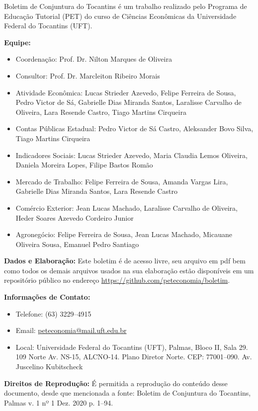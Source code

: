 \begin{tcolorbox}[colback=boxbackground, colframe=boxbackground, arc=0mm, top=15pt]
Boletim de Conjuntura do Tocantins é um trabalho realizado pelo Programa de Educação Tutorial (PET) do curso de Ciências Econômicas da Universidade Federal do Tocantins (UFT).
\\
\par{\bf Equipe:}
\begin{itemize}
	\item{Coordenação:} Prof. Dr. Nilton Marques de Oliveira
	\item{Consultor:} Prof. Dr. Marcleiton Ribeiro Morais
	\item{Atividade Econômica:} Lucas Strieder Azevedo, Felipe Ferreira de Sousa, Pedro Victor de Sá, Gabrielle Dias Miranda Santos, Laralisse Carvalho de Oliveira, Lara Resende Castro, Tiago Martins Cirqueira
	\item{Contas Públicas Estadual:} Pedro Victor de Sá Castro, Aleksander Bovo Silva, Tiago Martins Cirqueira
	\item{Indicadores Sociais:} Lucas Strieder Azevedo, Maria Claudia Lemos Oliveira, Daniela Moreira Lopes, Filipe Bastos Romão
	\item{Mercado de Trabalho:} Felipe Ferreira de Sousa, Amanda Vargas Lira, Gabrielle Dias Miranda Santos, Lara Resende Castro
	\item{Comércio Exterior:} Jean Lucas Machado,  Laralisse Carvalho de Oliveira, Heder Soares Azevedo Cordeiro Junior
	\item{Agronegócio:} Felipe Ferreira de Sousa, Jean Lucas Machado, Micauane Oliveira Sousa, Emanuel Pedro Santiago
\end{itemize}
\par{\bf Dados e Elaboração:}
Este boletim é de acesso livre, seu arquivo em pdf bem como todos os demais arquivos usados na sua elaboração estão disponíveis em um repositório público no endereço \url{https://github.com/peteconomia/boletim}.
\\
\par{\bf Informações de Contato:}
\begin{itemize}
	\item{Telefone:} (63) 3229--4915
	\item{Email:} \url{peteconomia@mail.uft.edu.br}
	\item{Local:} Universidade Federal do Tocantins (UFT), Palmas, Bloco II, Sala 29. 109 Norte Av. NS-15, ALCNO-14. Plano Diretor Norte. CEP: 77001--090. Av. Juscelino Kubitscheck
\end{itemize}
\par{\bf Direitos de Reprodução:}
É permitida a reprodução do conteúdo desse documento, desde que mencionada a fonte: Boletim de Conjuntura do Tocantins, Palmas v. 1 nº 1 Dez. 2020 p. 1--94.
\end{tcolorbox}